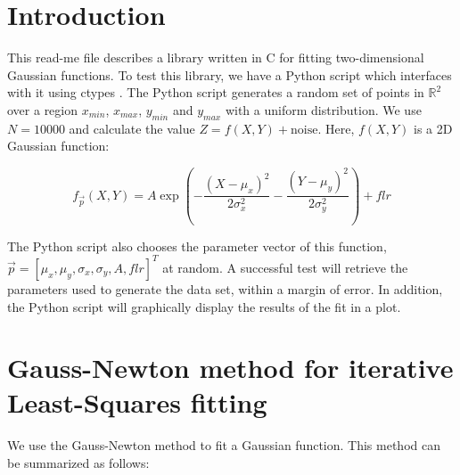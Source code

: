 \documentclass{article}
\begin{document}

\section{Introduction}

This read-me file describes a library written in C for fitting two-dimensional Gaussian functions. To test this library, we have a Python script which interfaces with it using ctypes \cite{ctypes}. The Python script generates a random set of points in $\mathbb{R}^2$ over a region $x_{min}$, $x_{max}$, $y_{min}$ and $y_{max}$ with a uniform distribution. We use $N=10000$ and calculate the value $Z=f(X,Y)+\text{noise}$. Here, $f(X,Y)$ is a 2D Gaussian function:

\begin{equation}
f_{\overrightarrow{p}}(X,Y) = A\exp(-\frac{(X-\mu_x)^2}{2\sigma_x^2}-\frac{(Y-\mu_y)^2}{2\sigma_y^2}) + flr
\label{twoDGauss}
\end{equation}

The Python script also chooses the parameter vector of this function, \\$\overrightarrow{p}=[\mu_x, \mu_y, \sigma_x, \sigma_y, A, flr]^T$ at random. A successful test will retrieve the parameters used to generate the data set, within a margin of error. In addition, the Python script will graphically display the results of the fit in a plot. 

\section{Gauss-Newton method for iterative Least-Squares fitting} \label{sec_fit}

We use the Gauss-Newton method to fit a Gaussian function. This method can be summarized as follows:  
\end{document}
